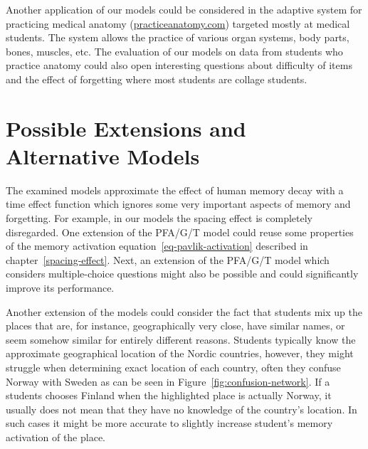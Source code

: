 Another application of our models could be considered in the adaptive system for practicing medical anatomy (\url{practiceanatomy.com}) targeted mostly at medical students. The system allows the practice of various organ systems, body parts, bones, muscles, etc. The evaluation of our models on data from students who practice anatomy could also open interesting questions about difficulty of items and the effect of forgetting where most students are collage students.

\section{Possible Extensions and Alternative Models}

The examined models approximate the effect of human memory decay with a time effect function which ignores some very important aspects of memory and forgetting. For example, in our models the spacing effect is completely disregarded. One extension of the PFA/G/T model could reuse some properties of the memory activation equation~\ref{eq-pavlik-activation} described in chapter~\ref{spacing-effect}. Next, an extension of the PFA/G/T model which considers multiple-choice questions might also be possible and could significantly improve its performance.

Another extension of the models could consider the fact that students mix up the places that are, for instance, geographically very close, have similar names, or seem somehow similar for entirely different reasons. Students typically know the approximate geographical location of the Nordic countries, however, they might struggle when determining exact location of each country, often they confuse Norway with Sweden as can be seen in Figure~\ref{fig:confusion-network}. If a students chooses Finland when the highlighted place is actually Norway, it usually does not mean that they have no knowledge of the country's location. In such cases it might be more accurate to slightly increase student's memory activation of the place.

